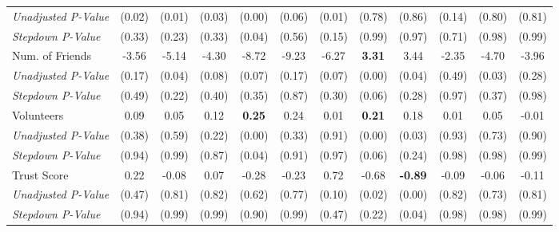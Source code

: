 \begin{tabular}{l c c c c c c c c c c c}
\quad \textit{Unadjusted P-Value} & (0.02) & (0.01) & (0.03) & (0.00) & (0.06) & (0.01) & (0.78) & (0.86) & (0.14) & (0.80) & (0.81) \\
\quad \textit{Stepdown P-Value} & (0.33) & (0.23) & (0.33) & (0.04) & (0.56) & (0.15) & (0.99) & (0.97) & (0.71) & (0.98) & (0.99) \\
Num. of Friends & -3.56 & -5.14 & -4.30 & -8.72 & -9.23 & -6.27 & \textbf{ 3.31 } & 3.44 & -2.35 & -4.70 & -3.96 \\
\quad \textit{Unadjusted P-Value} & (0.17) & (0.04) & (0.08) & (0.07) & (0.17) & (0.07) & (0.00) & (0.04) & (0.49) & (0.03) & (0.28) \\
\quad \textit{Stepdown P-Value} & (0.49) & (0.22) & (0.40) & (0.35) & (0.87) & (0.30) & (0.06) & (0.28) & (0.97) & (0.37) & (0.98) \\
Volunteers & 0.09 & 0.05 & 0.12 & \textbf{ 0.25 } & 0.24 & 0.01 & \textbf{ 0.21 } & 0.18 & 0.01 & 0.05 & -0.01 \\
\quad \textit{Unadjusted P-Value} & (0.38) & (0.59) & (0.22) & (0.00) & (0.33) & (0.91) & (0.00) & (0.03) & (0.93) & (0.73) & (0.90) \\
\quad \textit{Stepdown P-Value} & (0.94) & (0.99) & (0.87) & (0.04) & (0.91) & (0.97) & (0.06) & (0.24) & (0.98) & (0.98) & (0.99) \\
Trust Score & 0.22 & -0.08 & 0.07 & -0.28 & -0.23 & 0.72 & -0.68 & \textbf{ -0.89 } & -0.09 & -0.06 & -0.11 \\
\quad \textit{Unadjusted P-Value} & (0.47) & (0.81) & (0.82) & (0.62) & (0.77) & (0.10) & (0.02) & (0.00) & (0.82) & (0.73) & (0.81) \\
\quad \textit{Stepdown P-Value} & (0.94) & (0.99) & (0.99) & (0.90) & (0.99) & (0.47) & (0.22) & (0.04) & (0.98) & (0.98) & (0.99) \\
\bottomrule
\end{tabular}
